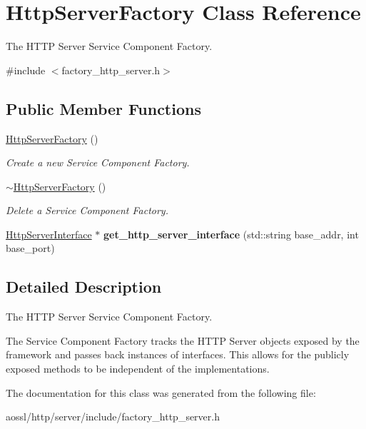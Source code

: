 \hypertarget{classHttpServerFactory}{}\section{Http\+Server\+Factory Class Reference}
\label{classHttpServerFactory}


The H\+T\+TP Server Service Component Factory.  




{\ttfamily \#include $<$factory\+\_\+http\+\_\+server.\+h$>$}

\subsection*{Public Member Functions}
\begin{DoxyCompactItemize}
\item 
\hyperlink{classHttpServerFactory_aedf936396d36dae5ff39e40f8ffc16b8}{Http\+Server\+Factory} ()\hypertarget{classHttpServerFactory_aedf936396d36dae5ff39e40f8ffc16b8}{}\label{classHttpServerFactory_aedf936396d36dae5ff39e40f8ffc16b8}

\begin{DoxyCompactList}\small\item\em Create a new Service Component Factory. \end{DoxyCompactList}\item 
\hyperlink{classHttpServerFactory_a0db223a7a26a343833ed2b12229189cd}{$\sim$\+Http\+Server\+Factory} ()\hypertarget{classHttpServerFactory_a0db223a7a26a343833ed2b12229189cd}{}\label{classHttpServerFactory_a0db223a7a26a343833ed2b12229189cd}

\begin{DoxyCompactList}\small\item\em Delete a Service Component Factory. \end{DoxyCompactList}\item 
\hyperlink{classHttpServerInterface}{Http\+Server\+Interface} $\ast$ {\bfseries get\+\_\+http\+\_\+server\+\_\+interface} (std\+::string base\+\_\+addr, int base\+\_\+port)\hypertarget{classHttpServerFactory_a423ec1185e8516ca882a61788161f9b4}{}\label{classHttpServerFactory_a423ec1185e8516ca882a61788161f9b4}

\end{DoxyCompactItemize}


\subsection{Detailed Description}
The H\+T\+TP Server Service Component Factory. 

The Service Component Factory tracks the H\+T\+TP Server objects exposed by the framework and passes back instances of interfaces. This allows for the publicly exposed methods to be independent of the implementations. 

The documentation for this class was generated from the following file\+:\begin{DoxyCompactItemize}
\item 
aossl/http/server/include/factory\+\_\+http\+\_\+server.\+h\end{DoxyCompactItemize}
